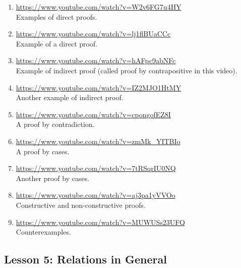 \documentclass[11pt]{amsart}
\begin{document}
\begin{enumerate}

\item \url{https://www.youtube.com/watch?v=W2v6FG7u4HY}\\
Examples of direct proofs.\\[5pt]


\item \url{https://www.youtube.com/watch?v=lj1flBUaCCc}\\
Example of a direct proof.\\[5pt]


\item \url{https://www.youtube.com/watch?v=hAFpc9abNFc}\\
Example of indirect proof (called proof by contrapositive in this video).\\[5pt]


\item \url{https://www.youtube.com/watch?v=IZ2MJO1HtMY}\\
Another example of indirect proof.\\[5pt]


\item \url{https://www.youtube.com/watch?v=cpongofEZ8I}\\
A proof by contradiction.\\[5pt]


\item \url{https://www.youtube.com/watch?v=zmMk_YITBIo}\\
A proof by cases.\\[5pt]


\item \url{https://www.youtube.com/watch?v=7tRSqrIU0NQ}\\
Another proof by cases.\\[5pt]


\item \url{https://www.youtube.com/watch?v=aj3pa1yVVOo}\\
Constructive and non-constructive proofs.\\[5pt]


\item \url{https://www.youtube.com/watch?v=MUWUSs23UFQ}\\
Counterexamples.\\[5pt]


\end{enumerate}


\subsection{Lesson 5: Relations in General }
\end{document}
